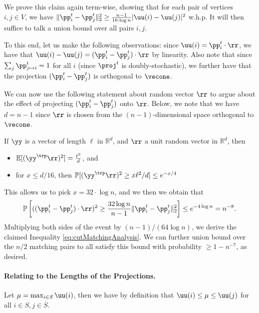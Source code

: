 We prove this claim again term-wise, showing that for each pair of vertices $i,j \in V$, we have $\|\pp_{i}^t - \pp_{j}^t \|_2^2 \geq \frac{n-1}{16 \cdot \log n} |\uu(i) - \uu(j)|^2$ w.h.p. It will then suffice to talk a union bound over all pairs $i,j$. 

To this end, let us make the following observations: since $\uu(i) = \pp_i^t \cdot \rr$, we have that $\uu(i) - \uu(j) = (\pp_i^t - \pp_j^t) \cdot \rr$ by linearity. Also note that since $\sum_j \pp_{j \mapsto i}^t = 1$ for all $i$ (since $\proj^t$ is doubly-stochastic), we further have that the projection $(\pp_i^t - \pp_j^t)$ is orthogonal to $\vecone$.

We can now use the following statement about random vector $\rr$ to argue about the effect of projecting $(\pp_i^t - \pp_j^t)$ onto $\rr$. Below, we note that we have $d = n-1$ since $\rr$ is chosen from the $(n-1)$-dimensional space orthogonal to $\vecone$.

\begin{theorem}\label{thm:factsGaussianAnnulus}
If $\yy$ is a vector of length $\ell$ in $\mathbb{R}^d$, and $\rr$ a unit random vector in $\mathbb{R}^d$, then
\begin{itemize}
    \item $\mathbb{E}[(\yy^\trp \rr)^2] = \frac{\ell^2}{d}$, and
    \item for $x \leq d/16$, then $\mathbb{P}[(\yy^\trp \rr)^2 \geq x\ell^2/d] \leq e^{-x/4}$
\end{itemize}
\end{theorem}

This allows us to pick $x = 32 \cdot \log n$, and we then we obtain that
\begin{equation}\label{eq:highProbEventCutMatching}
    \mathbb{P}\left[ ((\pp_i^t - \pp_j^t) \cdot \rr)^2 \geq  \frac{32 \log n}{n-1} \|\pp_i^t - \pp_j^t\|_2^2\right] \leq e^{-4 \log n} = n^{-8}.
\end{equation}
Multiplying both sides of the event by $(n-1)/(64 \log n)$, we derive the claimed Inequality  \eqref{eq:cutMatchingAnalysis}. We can further union bound over the $n/2$ matching pairs to all satisfy this bound with probability $\geq 1-n^{-7}$, as desired.

\paragraph{Relating to the Lengths of the Projections.} Let $\mu = \max_{i \in S} \uu(i)$, then we have by definition that $\uu(i) \leq \mu \leq \uu(j)$ for all $i \in S, j \in \overline{S}$.

